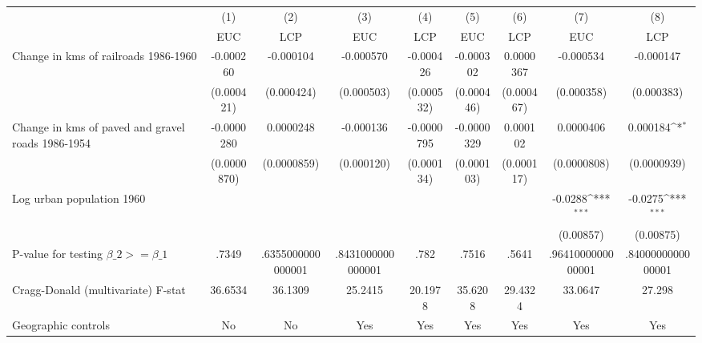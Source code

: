 {
\def\sym#1{\ifmmode^{#1}\else\(^{#1}\)\fi}
\begin{tabular}{l*{8}{c}}
\hline\hline
                &\multicolumn{1}{c}{(1)}&\multicolumn{1}{c}{(2)}&\multicolumn{1}{c}{(3)}&\multicolumn{1}{c}{(4)}&\multicolumn{1}{c}{(5)}&\multicolumn{1}{c}{(6)}&\multicolumn{1}{c}{(7)}&\multicolumn{1}{c}{(8)}\\
                &\multicolumn{1}{c}{EUC}&\multicolumn{1}{c}{LCP}&\multicolumn{1}{c}{EUC}&\multicolumn{1}{c}{LCP}&\multicolumn{1}{c}{EUC}&\multicolumn{1}{c}{LCP}&\multicolumn{1}{c}{EUC}&\multicolumn{1}{c}{LCP}\\
\hline
Change in kms of railroads 1986-1960&-0.000260         &-0.000104         &-0.000570         &-0.000426         &-0.000302         &0.0000367         &-0.000534         &-0.000147         \\
                &(0.000421)         &(0.000424)         &(0.000503)         &(0.000532)         &(0.000446)         &(0.000467)         &(0.000358)         &(0.000383)         \\
[1em]
Change in kms of paved and gravel roads 1986-1954&-0.0000280         &0.0000248         &-0.000136         &-0.0000795         &-0.0000329         & 0.000102         &0.0000406         & 0.000184\sym{*}  \\
                &(0.0000870)         &(0.0000859)         &(0.000120)         &(0.000134)         &(0.000103)         &(0.000117)         &(0.0000808)         &(0.0000939)         \\
[1em]
Log urban population 1960&                  &                  &                  &                  &                  &                  &  -0.0288\sym{***}&  -0.0275\sym{***}\\
                &                  &                  &                  &                  &                  &                  &(0.00857)         &(0.00875)         \\
\hline
P-value for testing $\beta\_{2} >= \beta\_{1}$&    .7349         &.6355000000000001         &.8431000000000001         &     .782         &    .7516         &    .5641         &.9641000000000001         &.8400000000000001         \\
Cragg-Donald (multivariate) F-stat&  36.6534         &  36.1309         &  25.2415         &  20.1978         &  35.6208         &  29.4324         &  33.0647         &   27.298         \\
Geographic controls&       No         &       No         &      Yes         &      Yes         &      Yes         &      Yes         &      Yes         &      Yes         \\

\end{tabular}}
